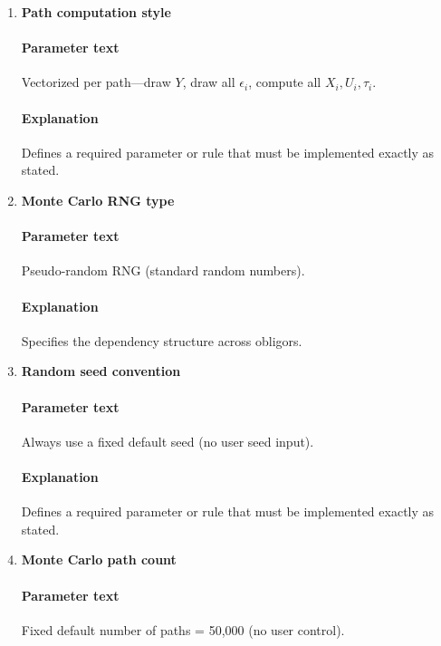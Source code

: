 \documentclass[11pt]{article}
\begin{document}
\begin{enumerate}[label=\arabic*),leftmargin=*,align=left]
\paragraph{Parameter text} Analytic inversion using your piecewise-constant forward hazards $\lambda_k$ by tenor interval (no numerical root finding).
\paragraph{Explanation} Specifies when a simulated default becomes economically effective.

\item \textbf{Path computation style}
\paragraph{Parameter text} Vectorized per path—draw $Y$, draw all $\epsilon_i$, compute all $X_i, U_i, \tau_i$.
\paragraph{Explanation} Defines a required parameter or rule that must be implemented exactly as stated.

\item \textbf{Monte Carlo RNG type}
\paragraph{Parameter text} Pseudo-random RNG (standard random numbers).
\paragraph{Explanation} Specifies the dependency structure across obligors.

\item \textbf{Random seed convention}
\paragraph{Parameter text} Always use a fixed default seed (no user seed input).
\paragraph{Explanation} Defines a required parameter or rule that must be implemented exactly as stated.

\item \textbf{Monte Carlo path count}
\paragraph{Parameter text} Fixed default number of paths = 50,000 (no user control).

\end{enumerate}
\end{document}
